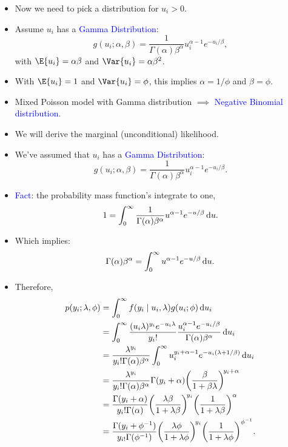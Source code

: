 \documentclass[oneside]{book}\usepackage[]{graphicx}\usepackage[svgnames]{xcolor}
\begin{document}
\begin{itemize}
    \item Now we need to pick a distribution for $ u_i>0 $.
    \item Assume $ u_i $ has a \textcolor{Blue}{Gamma Distribution}:
          \[ g(u_i;\alpha,\beta)=\frac{1}{\Gamma(\alpha)\beta^\alpha}u_i^{\alpha-1}e^{-u_i/\beta}, \]
          with $ \E{u_i}=\alpha\beta $ and $ \Var{u_i}=\alpha\beta^2 $.
    \item With $ \E{u_i}=1 $ and $ \Var{u_i}=\phi $, this implies $ \alpha=1/\phi $ and $ \beta=\phi $.
    \item Mixed Poisson model with Gamma distribution $ \implies $ \textcolor{Blue}{Negative Binomial distribution}.
    \item We will derive the marginal (unconditional) likelihood.
    \item We've assumed that $ u_i $ has a \textcolor{Blue}{Gamma Distribution}:
          \[ g(u_i;\alpha,\beta)=\frac{1}{\Gamma(\alpha)\beta^\alpha}u_i^{\alpha-1}e^{-u_i/\beta}. \]
    \item \textcolor{Blue}{Fact}: the probability mass function's integrate to one,
          \[ 1=\int_{0}^{\infty}\frac{1}{\Gamma(\alpha)\beta^\alpha}u^{\alpha-1}e^{-u/\beta}\odif{u}. \]
    \item Which implies:
          \[ \Gamma(\alpha)\beta^\alpha=\int_{0}^{\infty}u^{\alpha-1}e^{-u/\beta}\odif{u}. \]
    \item Therefore,
          \begin{align*}
              p(y_i;\lambda,\phi)
               & =\int_{0}^{\infty} f(y_i\mid u_i,\lambda) g(u_i; \phi) \odif{u_i}                                                                                                     \\
               & =\int_{0}^{\infty} \frac{(u_i \lambda)^{y_i} e^{-u_i \lambda}}{y_i!}\frac{u_i^{\alpha-1} e^{-u_i / \beta}}{\Gamma(\alpha) \beta^{\alpha}} \odif{u_i}                  \\
               & =\frac{\lambda^{y_i}}{y_i ! \Gamma(\alpha) \beta^{\alpha}} \int_{0}^{\infty} u_i^{y_i+\alpha-1} e^{-u_i(\lambda+1 / \beta)} \odif{u_i}                                \\
               & =\frac{\lambda^{y_i}}{y_i ! \Gamma(\alpha) \beta^{\alpha}} \Gamma(y_i+\alpha)\biggl(\frac{\beta}{1+\beta \lambda}\biggr)^{\! y_i+\alpha}                              \\
               & =\frac{\Gamma(y_i+\alpha)}{y_i ! \Gamma(\alpha)}\biggl(\frac{\lambda \beta}{1+\lambda \beta}\biggr)^{\!y_i}\biggl(\frac{1}{1+\lambda \beta}\biggr)^{\alpha}           \\
               & =\frac{\Gamma(y_i+\phi^{-1})}{y_{i !} \Gamma(\phi^{-1})}\biggl(\frac{\lambda \phi}{1+\lambda \phi}\biggr)^{\! y_i}\biggl(\frac{1}{1+\lambda \phi}\biggr)^{\phi^{-1}}.
          \end{align*}
\end{itemize}
\end{document}
